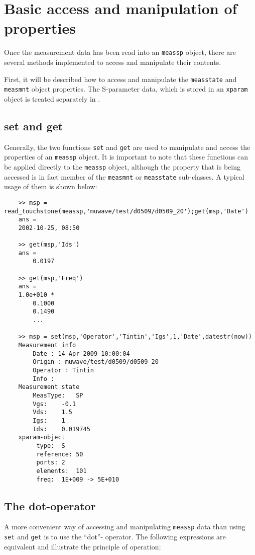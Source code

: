 %
\section{Basic access and manipulation of properties}\label{sec:DACManip}
Once the measurement data has been read into an \verb"meassp"
object, there are several methods implemented to access and
manipulate their contents.

First, it will be described how to access and manipulate the
\verb"measstate" and \verb"measmnt" object properties. The
S-parameter data, which is stored in an \verb"xparam" object is
treated separately in .

\subsection{set and get}
Generally, the two functions \verb"set" and \verb"get" are used to
manipulate and access the properties of an \verb"meassp" object.
It is important to note that these functions can be applied
directly to the \verb"meassp" object, although the property that
is being accessed is in fact member of the \verb"measmnt" or
\verb"measstate" sub-classes. A typical usage of them is shown
below:

\begin{small}
\begin{verbatim}
    >> msp = read_touchstone(meassp,'muwave/test/d0509/d0509_20');get(msp,'Date')
    ans =
    2002-10-25, 08:50

    >> get(msp,'Ids')
    ans =
        0.0197

    >> get(msp,'Freq')
    ans =
    1.0e+010 *
        0.1000
        0.1490
        ...

    >> msp = set(msp,'Operator','Tintin','Igs',1,'Date',datestr(now))
    Measurement info
        Date : 14-Apr-2009 10:00:04
        Origin : muwave/test/d0509/d0509_20
        Operator : Tintin
        Info :
    Measurement state
    	MeasType:	SP
    	Vgs:	-0.1
    	Vds:	1.5
    	Igs:	1
    	Ids:	0.019745
    xparam-object
    	 type:	S
    	 reference:	50
    	 ports:	2
    	 elements:	101
    	 freq:	1E+009 -> 5E+010
\end{verbatim}
\end{small}

\subsection{The dot-operator}
A more convenient way of accessing and manipulating \verb"meassp"
data than using \verb"set" and \verb"get" is to use the ``dot''-
operator. The following expressions are equivalent and illustrate
the principle of operation:

